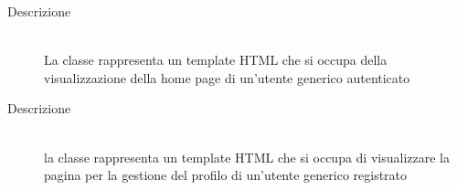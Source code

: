 \vspace{0.5cm}
\hypertarget{client::view::user::Home}{}
\begin{description}
\item[Descrizione] \hfill \\
La classe rappresenta un template HTML che si occupa della visualizzazione della home page di un'utente generico autenticato
\end{description}

\vspace{0.5cm}
\hypertarget{client::view::user::User}{}
\begin{description}
\item[Descrizione] \hfill \\
la classe rappresenta un template HTML che si occupa di visualizzare la pagina per la gestione del profilo di un'utente generico registrato
\end{description}

\vspace{0.5cm}
